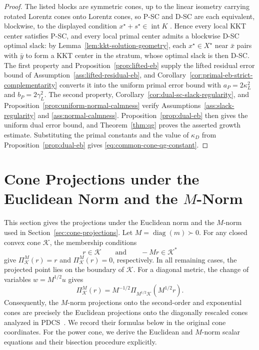 \documentclass[letterpaper]{article} %
\theoremstyle{definition}
\theoremstyle{remark}
\begin{document}
\begin{proof}
The listed blocks are symmetric cones, up to the linear isometry carrying
rotated Lorentz cones onto Lorentz cones, so P-SC and D-SC are each
equivalent, blockwise, to the displayed condition
$x^\star+s^\star\in\operatorname{int}K$
\cite{chua2008invariance,faraut1994analysis}.  Hence every local KKT
center satisfies P-SC, and every local primal center admits a blockwise
D-SC optimal slack: by Lemma~\ref{lem:kkt-solution-geometry}, each
$x^\star\in X^\star$ near $\bar x$ pairs with $\bar y$ to form a KKT
center in the stratum, whose optimal slack is then D-SC.  The first
property and Proposition~\ref{prop:lifted-eb} supply the lifted residual
error bound of Assumption~\ref{ass:lifted-residual-eb}, and
Corollary~\ref{cor:primal-eb-strict-complementarity} converts it into the
uniform primal error bound with $a_P=2\kappa_L^2$ and
$b_P=2\gamma_L^2$.  The second property,
Corollary~\ref{cor:dual-sc-slack-regularity}, and
Proposition~\ref{prop:uniform-normal-calmness} verify
Assumptions~\ref{ass:slack-regularity} and \ref{ass:normal-calmness}.
Proposition~\ref{prop:dual-eb} then gives the
uniform dual error bound, and Theorem~\ref{thm:qg} proves the asserted
growth estimate.  Substituting the primal constants and the value of
$\kappa_D$ from Proposition~\ref{prop:dual-eb} gives
\eqref{eq:common-cone-qg-constant}.
\end{proof}

\section{Cone Projections under the Euclidean Norm and the
\texorpdfstring{$M$}{M}-Norm}
\label{app:cone-projections}

This section gives the projections under the Euclidean norm and the $M$-norm
used in Section~\ref{sec:cone-projections}.  Let
$M=\operatorname{diag}(m)\succ0$.
For any closed convex cone $\mathcal K$, the membership conditions
\[
    r\in\mathcal K
    \qquad\text{and}\qquad
    -Mr\in\mathcal K^*
\]
give $\Pi_{\mathcal K}^M(r)=r$ and
$\Pi_{\mathcal K}^M(r)=0$, respectively.  In all remaining cases, the
projected point lies on the boundary of $\mathcal K$.
For a diagonal metric, the change of variables $w=M^{1/2}u$ gives
\begin{equation}
\label{eq:metric-rescaled-cone-equivalence}
    \Pi_{\mathcal K}^{M}(r)
    =M^{-1/2}\Pi_{M^{1/2}\mathcal K}(M^{1/2}r).
\end{equation}
Consequently, the $M$-norm projections onto the second-order and exponential
cones are precisely the Euclidean projections onto the diagonally rescaled
cones analyzed in PDCS~\cite{lin2025pdcs}. We record their formulas below in
the original cone coordinates. For the power cone, we derive the Euclidean
and $M$-norm scalar equations and their bisection procedure explicitly.
\end{document}
